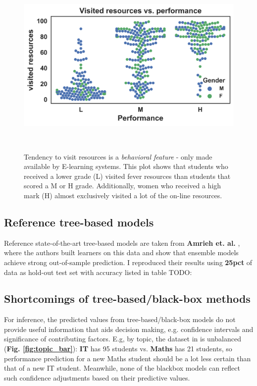 \documentclass{sigchi}
\begin{document}
\begin{figure}
	\centering
	\includegraphics[width=0.95\columnwidth]{figures/vresources_outcome.png}
	\caption{
		Tendency to visit resources is a \textit{behavioral feature} - only made available by E-learning systems. This plot shows that students who received a lower grade (L) visited fever resources than students that scored a M or H grade. Additionally, women who received a high mark (H) almost exclusively visited a lot of the on-line resources.
	}~\label{fig:vresources_outcome}	
\end{figure}


\subsection{Reference tree-based models}
Reference state-of-the-art tree-based models are taken from \textbf{Amrieh
et. al.} \cite{amrieh2016mining}, where the authors built learners on this data and show that ensemble
models achieve strong out-of-sample prediction. I reproduced their results using \textbf{25pct} of data as hold-out test set with accuracy listed in table TODO:


\subsection{Shortcomings of tree-based/black-box methods}
For inference, the predicted values from tree-based/black-box models do not provide useful
information that aids decision making, e.g. confidence intervals and
significance of contributing factors. 
\cite{efron2016computer, meier2016predicting} E.g, by topic, the dataset in
\cite{amrieh2016mining} is unbalanced (\textbf{Fig. \ref{fig:topic_bar}}): \textbf{IT} has 95 students
vs. \textbf{Maths} has 21 students, so performance prediction for a new Maths
student should be a lot less certain than that of a new IT
student. Meanwhile, none of the blackbox models can reflect such confidence
adjustments based on their predictive values.
\end{document}
